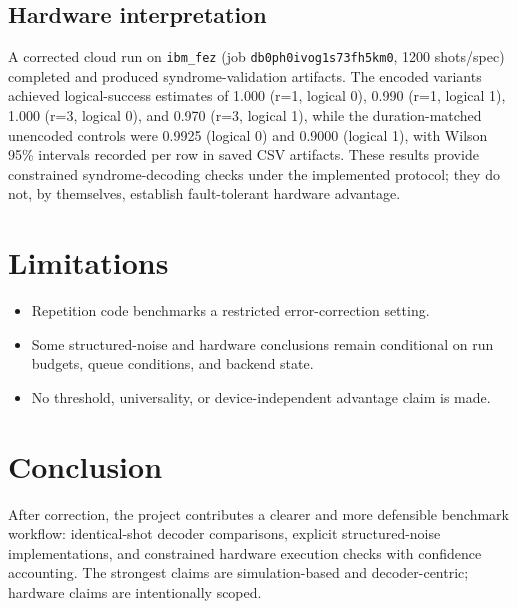 \documentclass[11pt]{article}
\begin{document}
\subsection{Hardware interpretation}
A corrected cloud run on \texttt{ibm\_fez} (job \texttt{db0ph0ivog1s73fh5km0}, 1200 shots/spec) completed and produced syndrome-validation artifacts. The encoded variants achieved logical-success estimates of 1.000 (r=1, logical 0), 0.990 (r=1, logical 1), 1.000 (r=3, logical 0), and 0.970 (r=3, logical 1), while the duration-matched unencoded controls were 0.9925 (logical 0) and 0.9000 (logical 1), with Wilson 95\% intervals recorded per row in saved CSV artifacts. These results provide constrained syndrome-decoding checks under the implemented protocol; they do not, by themselves, establish fault-tolerant hardware advantage.

\section{Limitations}
\begin{itemize}
    \item Repetition code benchmarks a restricted error-correction setting.
    \item Some structured-noise and hardware conclusions remain conditional on run budgets, queue conditions, and backend state.
    \item No threshold, universality, or device-independent advantage claim is made.
\end{itemize}

\section{Conclusion}
After correction, the project contributes a clearer and more defensible benchmark workflow: identical-shot decoder comparisons, explicit structured-noise implementations, and constrained hardware execution checks with confidence accounting. The strongest claims are simulation-based and decoder-centric; hardware claims are intentionally scoped.
\end{document}
